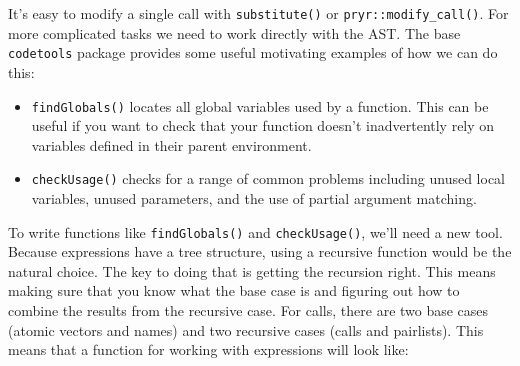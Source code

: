 
It's easy to modify a single call with \texttt{substitute()} or
\texttt{pryr::modify\_call()}. For more complicated tasks we need to
work directly with the AST. The base \texttt{codetools} package provides
some useful motivating examples of how we can do this:

\begin{itemize}
\item
  \texttt{findGlobals()} locates all global variables used by a
  function. This can be useful if you want to check that your function
  doesn't inadvertently rely on variables defined in their parent
  environment.
\item
  \texttt{checkUsage()} checks for a range of common problems including
  unused local variables, unused parameters, and the use of partial
  argument matching.
\end{itemize}

To write functions like \texttt{findGlobals()} and
\texttt{checkUsage()}, we'll need a new tool. Because expressions have a
tree structure, using a recursive function would be the natural choice.
The key to doing that is getting the recursion right. This means making
sure that you know what the base case is and figuring out how to combine
the results from the recursive case. For calls, there are two base cases
(atomic vectors and names) and two recursive cases (calls and
pairlists). This means that a function for working with expressions will
look like:

\begin{Shaded}
\begin{Highlighting}[]
\StringTok{ }
    \NormalTok{(}\NormalTok{, }
       \NormalTok{)}
  \NormalTok{\}}
\NormalTok{\}}
\end{Highlighting}
\end{Shaded}

